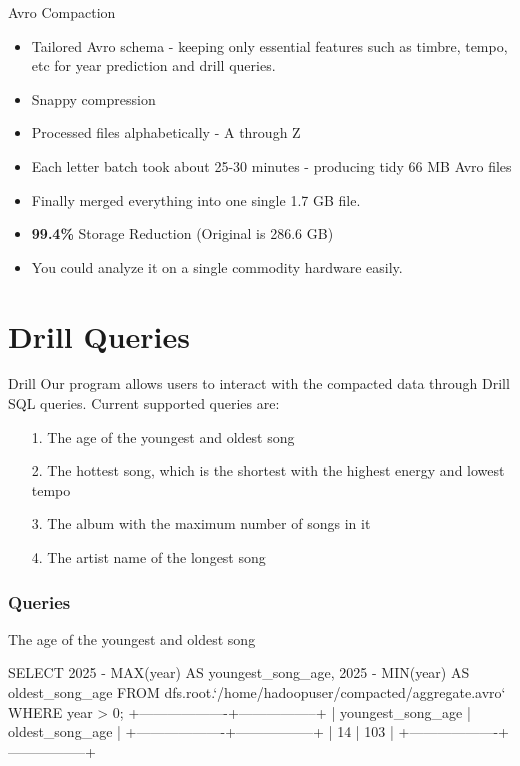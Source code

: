 \documentclass{beamer}
\begin{document}
\begin{frame}{Avro Compaction}

    \begin{itemize}
        \item Tailored Avro schema - keeping only essential features such as timbre, tempo, etc for year prediction and drill queries.
        \item Snappy compression
        \item Processed files alphabetically - A through Z
        \item Each letter batch took about 25-30 minutes - producing tidy 66 MB Avro files
        \item Finally merged everything into one single 1.7 GB file.
        \item \textbf{99.4\%} Storage Reduction (Original is 286.6 GB)
        \item You could analyze it on a single commodity hardware easily.
    \end{itemize}

\end{frame}

\section{Drill Queries}

\begin{frame}{Drill}
Our program allows users to interact with the compacted data through Drill SQL queries. Current supported queries are:

\begin{itemize}
    \item [1.] The age of the youngest and oldest song
    \item [2.] The hottest song, which is the shortest with the highest energy and lowest tempo
    \item [3.] The album with the maximum number of songs in it
    \item [4.] The artist name of the longest song
\end{itemize}
\end{frame}

\begin{frame}[fragile]
    \frametitle{Queries}

    \begin{center}
        The age of the youngest and oldest song
    \end{center}
    
    \begin{mycodetiny}
        SELECT 
            2025 - MAX(year) AS youngest_song_age,
            2025 - MIN(year) AS oldest_song_age
        FROM dfs.root.`/home/hadoopuser/compacted/aggregate.avro`
        WHERE year > 0;
        +-------------------+-----------------+
        | youngest_song_age | oldest_song_age |
        +-------------------+-----------------+
        | 14                | 103             |
        +-------------------+-----------------+
    \end{mycodetiny}
\end{frame}
\end{document}

